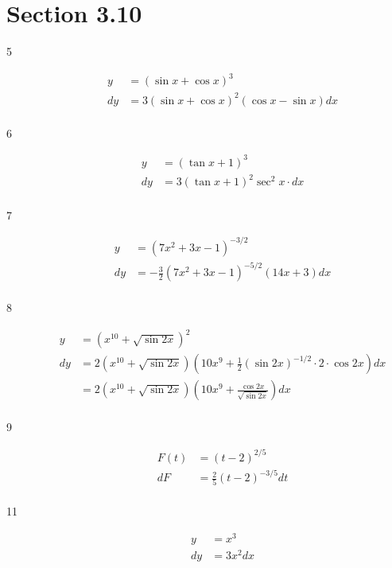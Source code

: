 \documentclass[fleqn]{exam}
\begin{document}
\ifprintanswers

\section{Section 3.10}

\begin{description}
\item[5]
\begin{align*}
  y &= (\sin x + \cos x)^3 \\
  dy &= 3 (\sin x + \cos x)^2 (\cos x - \sin x) dx \\
\end{align*}

\item[6]
\begin{align*}
  y &= (\tan x + 1)^3 \\
  dy &= 3 (\tan x + 1)^2 \sec^2 x \cdot dx \\
\end{align*}

\item[7]
\begin{align*}
  y &= (7x^2 + 3x - 1)^{-3/2} \\
  dy &= - \frac{3}{2} (7x^2 + 3x - 1)^{-5/2} (14x + 3) dx \\
\end{align*}

\item[8]
\begin{align*}
  y  &= (x^{10} + \sqrt{\sin 2x})^2 \\
  dy &= 2(x^{10} + \sqrt{\sin 2x}) \left(10x^9 + \frac{1}{2} (\sin 2x)^{-1/2} \cdot 2 \cdot \cos 2x \right) dx \\
     &= 2(x^{10} + \sqrt{\sin 2x}) \left(10x^9 + \frac{\cos 2x}{\sqrt{\sin 2x}} \right) dx \\
\end{align*}

\item[9]
\begin{align*}
  F(t) &= (t - 2)^{2/5} \\
  dF   &= \frac{2}{5} (t - 2)^{-3/5} dt \\
\end{align*}

\item[11]
\begin{align*}
  y &= x^3 \\
  dy &= 3x^2 dx \\
\end{align*}


\end{description}
\end{document}

